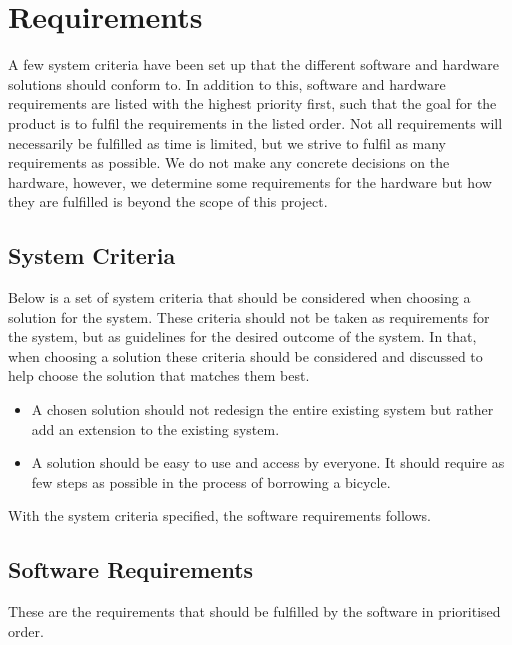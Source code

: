 \section{Requirements}
A few system criteria have been set up that the different software and hardware solutions should conform to. 
In addition to this, software and hardware requirements are listed with the highest priority first, such that the goal for the product is to fulfil the requirements in the listed order. 
Not all requirements will necessarily be fulfilled as time is limited, but we strive to fulfil as many requirements as possible.
We do not make any concrete decisions on the hardware, however, we determine some requirements for the hardware but how they are fulfilled is beyond the scope of this project.

\subsection{System Criteria}\label{sec:systemCriteria}
Below is a set of system criteria that should be considered when choosing a solution for the system.
These criteria should not be taken as requirements for the system, but as guidelines for the desired outcome of the system.
In that, when choosing a solution these criteria should be considered and discussed to help choose the solution that matches them best.

\begin{itemize}
	\item A chosen solution should not redesign the entire existing system but rather add an extension to the existing system.
	\item A solution should be easy to use and access by everyone. 
	It should require as few steps as possible in the process of borrowing a bicycle.
\end{itemize}

With the system criteria specified, the software requirements follows.

\subsection{Software Requirements}
These are the requirements that should be fulfilled by the software in prioritised order.

